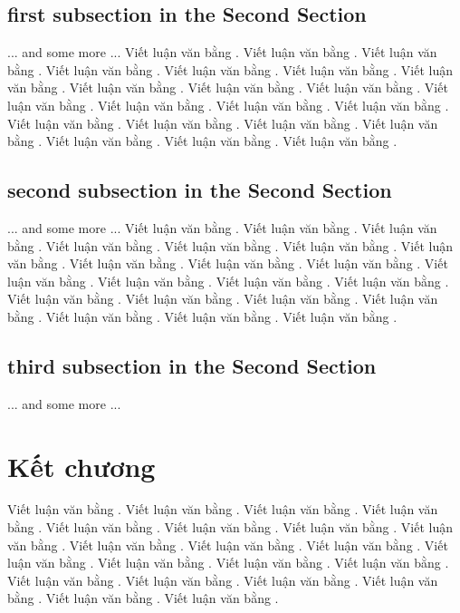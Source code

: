 \subsection{first subsection in the Second Section}
... and some more ...
Viết luận văn bằng  . Viết luận văn bằng  . Viết luận văn bằng  . Viết luận văn bằng  . Viết luận văn bằng  . Viết luận văn bằng  . Viết luận văn bằng  . Viết luận văn bằng  . Viết luận văn bằng  . Viết luận văn bằng  . Viết luận văn bằng  . Viết luận văn bằng  . Viết luận văn bằng  . Viết luận văn bằng  . Viết luận văn bằng  . Viết luận văn bằng  . Viết luận văn bằng  . Viết luận văn bằng  . Viết luận văn bằng  . Viết luận văn bằng  . Viết luận văn bằng  . 
\subsection{second subsection in the Second Section}
... and some more ...
Viết luận văn bằng  . Viết luận văn bằng  . Viết luận văn bằng  . Viết luận văn bằng  . Viết luận văn bằng  . Viết luận văn bằng  . Viết luận văn bằng  . Viết luận văn bằng  . Viết luận văn bằng  . Viết luận văn bằng  . Viết luận văn bằng  . Viết luận văn bằng  . Viết luận văn bằng  . Viết luận văn bằng  . Viết luận văn bằng  . Viết luận văn bằng  . Viết luận văn bằng  . Viết luận văn bằng  . Viết luận văn bằng  . Viết luận văn bằng  . Viết luận văn bằng  . 
\subsection{third subsection in the Second Section}
... and some more ...

\section{Kết chương}
Viết luận văn bằng  . Viết luận văn bằng  . Viết luận văn bằng  . Viết luận văn bằng  . Viết luận văn bằng  . Viết luận văn bằng  . Viết luận văn bằng  . Viết luận văn bằng  . Viết luận văn bằng  . Viết luận văn bằng  . Viết luận văn bằng  . Viết luận văn bằng  . Viết luận văn bằng  . Viết luận văn bằng  . Viết luận văn bằng  . Viết luận văn bằng  . Viết luận văn bằng  . Viết luận văn bằng  . Viết luận văn bằng  . Viết luận văn bằng  . Viết luận văn bằng  .  
